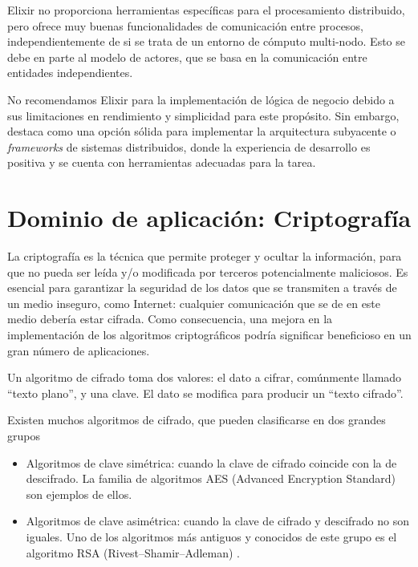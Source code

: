 \documentclass[11pt]{article}
\let\Oldsection\section
\renewcommand{\section}{\FloatBarrier\Oldsection}
\begin{document}
Elixir no proporciona herramientas específicas para el procesamiento distribuido, pero ofrece muy buenas funcionalidades de comunicación entre procesos, independientemente de si se trata de un entorno de cómputo multi-nodo. Esto se debe en parte al modelo de actores, que se basa en la comunicación entre entidades independientes.

No recomendamos Elixir para la implementación de lógica de negocio debido a sus limitaciones en rendimiento y simplicidad para este propósito. Sin embargo, destaca como una opción sólida para implementar la arquitectura subyacente o \textit{frameworks} de sistemas distribuidos, donde la experiencia de desarrollo es positiva y se cuenta con herramientas adecuadas para la tarea.

\newpage

\section{Dominio de aplicación: Criptografía}

La criptografía es la técnica que permite proteger y ocultar la información, para que no pueda ser leída y/o modificada por terceros potencialmente maliciosos. Es esencial para garantizar la seguridad de los datos que se transmiten a través de un medio inseguro, como Internet: cualquier comunicación que se de en este medio debería estar cifrada. Como consecuencia, una mejora en la implementación de los algoritmos criptográficos podría significar beneficioso en un gran número de aplicaciones.

Un algoritmo de cifrado toma dos valores: el dato a cifrar, comúnmente llamado ``texto plano'', y una clave. El dato se modifica para producir un ``texto cifrado''.

Existen muchos algoritmos de cifrado, que pueden clasificarse en dos grandes grupos

\begin{itemize}
    \item Algoritmos de clave simétrica: cuando la clave de cifrado coincide con la de descifrado. La familia de algoritmos AES (Advanced Encryption Standard) \cite{aes:aes} son ejemplos de ellos.
    \item Algoritmos de clave asimétrica: cuando la clave de cifrado y descifrado no son iguales. Uno de los algoritmos más antiguos y conocidos de este grupo es el algoritmo RSA (Rivest–Shamir–Adleman) \cite{aes:rsa}.
\end{itemize}
\end{document}
